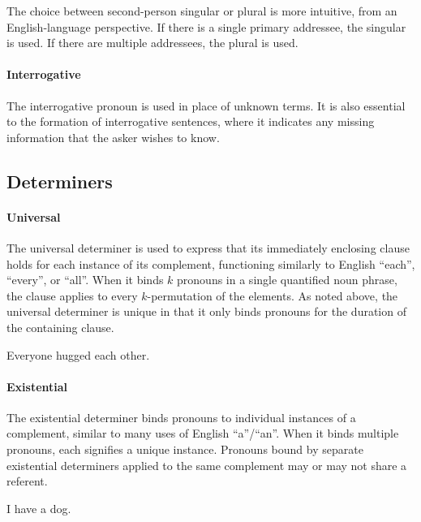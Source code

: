 The choice between second-person singular or plural is more intuitive, from an
English-language perspective. If there is a single primary addressee, the
singular is used. If there are multiple addressees, the plural is used.


\paragraph{Interrogative} The interrogative pronoun  is used in place
of unknown terms. It is also essential to the formation of interrogative
sentences, where it indicates any missing information that the asker wishes to
know.

\subsection{Determiners} \label{sec:determiners}

\paragraph{Universal} The universal determiner  is used to express that
its immediately enclosing clause holds for each instance of its complement,
functioning similarly to English ``each'', ``every'', or ``all''. When it binds
$k$ pronouns in a single quantified noun phrase, the clause applies to every
$k$-permutation of the elements. As noted above, the universal determiner is
unique in that it only binds pronouns for the duration of the containing clause.

{Everyone hugged each other.}
{}

\paragraph{Existential} The existential determiner  binds pronouns to
individual instances of a complement, similar to many uses of English
``a''/``an''. When it binds multiple pronouns, each signifies a unique instance.
Pronouns bound by separate existential determiners applied to the same
complement may or may not share a referent.

{I have a dog.}
{}


